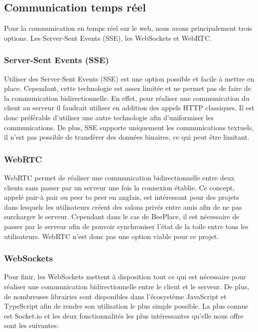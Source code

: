 \subsection{Communication temps réel}

Pour la communication en temps réel sur le web, nous avons principalement trois options. Les Server-Sent Events (SSE), les WebSockets et WebRTC.

\subsubsection{Server-Sent Events (SSE)}
Utiliser des Server-Sent Events (SSE) est une option possible et facile à mettre en place. Cependant, cette technologie est assez limitée et ne permet pas de faire de la communication bidirectionnelle. En effet, pour réaliser une communication du client au serveur il faudrait utiliser en addition des appels HTTP classiques. Il est donc préférable d'utiliser une autre technologie afin d'uniformiser les communications. De plus, SSE supporte uniquement les communications textuels, il n'est pas possible de transférer des données binaires, ce qui peut être limitant.

\subsubsection{WebRTC}
WebRTC permet de réaliser une communication bidirectionnelle entre deux clients sans passer par un serveur une fois la connexion établie. Ce concept, appelé pair-à pair ou peer to peer en anglais, est intéressant pour des projets dans lesquels les utilisateurs créent des salons privés entre amis afin de ne pas surcharger le serveur. Cependant dans le cas de BeePlace, il est nécessaire de passer par le serveur afin de pouvoir synchroniser l'état de la toile entre tous les utilisateurs. WebRTC n'est donc pas une option viable pour ce projet.

\subsubsection{WebSockets}
Pour finir, les WebSockets mettent à disposition tout ce qui est nécessaire pour réaliser une communication bidirectionnelle entre le client et le serveur. De plus, de nombreuses librairies sont disponibles dans l'écosystème JavaScript et TypeScript afin de rendre son utilisation le plus simple possible. La plus connue est Socket.io et les deux fonctionnalités les plus intéressantes qu'elle nous offre sont les suivantes:


